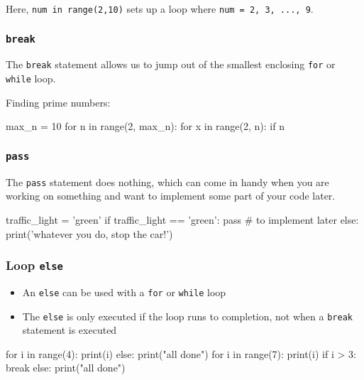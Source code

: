 \documentclass[12pt]{article} \newif\ifsolution\solutiontrue %
\begin{document}
Here, \texttt{num\ in\ range(2,10)} sets up a loop where
\texttt{num\ =\ 2,\ 3,\ ...,\ 9}.

\subsubsection{\texorpdfstring{\texttt{break}}{break}}\label{break}

The \texttt{break} statement allows us to jump out of the smallest
enclosing \texttt{for} or \texttt{while} loop.

Finding prime numbers:

\begin{python}
max_n = 10 for n in range(2, max_n):     for x in range(2, n):         if n %
\end{python}

\subsubsection{\texorpdfstring{\texttt{pass}}{pass}}\label{pass}

The \texttt{pass} statement does nothing, which can come in handy when
you are working on something and want to implement some part of your
code later.

\begin{python}
traffic_light = 'green' if traffic_light == 'green':     pass # to implement later else:     print('whatever you do, stop the car!')
\end{python}

\subsubsection{\texorpdfstring{Loop
\texttt{else}}{Loop else}}\label{loop-else}

\begin{itemize}
\item
  An \texttt{else} can be used with a \texttt{for} or \texttt{while}
  loop
\item
  The \texttt{else} is only executed if the loop runs to completion, not
  when a \texttt{break} statement is executed
\end{itemize}

\begin{python}
for i in range(4):     print(i) else:     print("all done")  for i in range(7):     print(i)     if i > 3:         break else:     print("all done")
\end{python}
\end{document}
